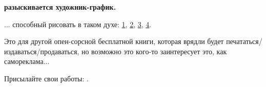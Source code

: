 \vspace*{\fill}

\normalsize \textbf{разыскивается художник-график.}

\bigskip
\bigskip
\bigskip

... способный рисовать в таком духе:
\href{https://github.com/DennisYurichev/RE-for-beginners/blob/master/cover.jpg}{1},
\href{https://github.com/DennisYurichev/RE-for-beginners/blob/master/cover2.jpg}{2},
\href{https://github.com/DennisYurichev/RE-for-beginners/blob/master/cover3.jpg}{3},
\href{https://github.com/DennisYurichev/RE-for-beginners/blob/master/cover4.jpg}{4}.

Это для другой опен-сорсной бесплатной книги, которая врядли будет печататься/издаваться/продаваться,
но возможно это кого-то заинтересует это, как самореклама...

Присылайте свои работы: \EMAIL.

\bigskip
\bigskip
\bigskip

\vspace*{\fill}
\vfill
